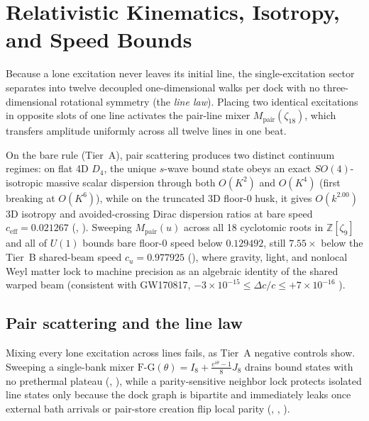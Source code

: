 \section{Relativistic Kinematics, Isotropy, and Speed Bounds}
\label{sec:relativity}

Because a lone excitation never leaves its initial line, the single-excitation sector separates into twelve decoupled
one-dimensional walks per dock with no three-dimensional rotational symmetry (the \emph{line law}). Placing two
identical excitations in opposite slots of one line activates the pair-line mixer $M_{\mathrm{pair}}(\zeta_{18})$,
which transfers amplitude uniformly across all twelve lines in one beat.

On the bare rule (Tier~A), pair scattering produces two distinct continuum regimes: on flat 4D $D_4$, the unique
$s$-wave bound state obeys an exact $SO(4)$-isotropic massive scalar dispersion through both $O(K^2)$ and $O(K^4)$
(first breaking at $O(K^6)$), while on the truncated 3D floor-0 husk, it gives $O(k^{2.00})$ 3D isotropy and
avoided-crossing Dirac dispersion ratios at bare speed $c_{\mathrm{eff}} = 0.021267$ (,
). Sweeping $M_{\mathrm{pair}}(u)$ across all 18 cyclotomic roots in $\mathbb{Z}[\zeta_9]$ and all of
$U(1)$ bounds bare floor-0 speed below $0.129492$, still $7.55\times$ below the Tier~B shared-beam speed
$c_u = 0.977925$ (), where gravity, light, and nonlocal Weyl matter lock to machine precision as an
algebraic identity of the shared warped beam (consistent with GW170817,
$-3 \times 10^{-15} \le \Delta c / c \le +7 \times 10^{-16}$ \cite{abbott2017gw170817}).

\subsection{Pair scattering and the line law}

Mixing every lone excitation across lines fails, as Tier~A negative controls show.
Sweeping a single-bank mixer $\mathrm{F\text{-}G}(\theta) = I_8 + \frac{e^{i\theta}-1}{8} J_8$ drains bound states with
no prethermal plateau (, ), while a parity-sensitive neighbor lock protects isolated
line states only because the dock graph is bipartite and immediately leaks once external bath arrivals or pair-store
creation flip local parity (, , ).


